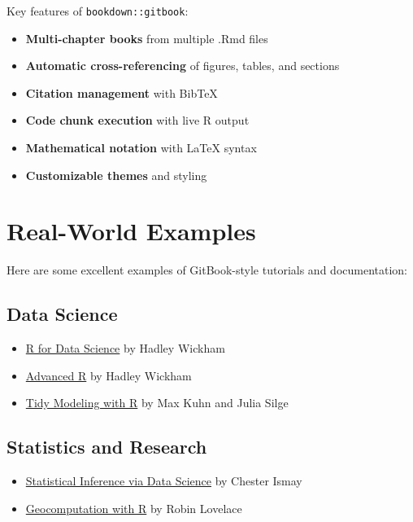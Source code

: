 \documentclass[
]{book}
\providecommand{\tightlist}{%
  \setlength{\itemsep}{0pt}\setlength{\parskip}{0pt}}
\begin{document}
Key features of \texttt{bookdown::gitbook}:

\begin{itemize}
\tightlist
\item
  \textbf{Multi-chapter books} from multiple .Rmd files
\item
  \textbf{Automatic cross-referencing} of figures, tables, and sections
\item
  \textbf{Citation management} with BibTeX
\item
  \textbf{Code chunk execution} with live R output
\item
  \textbf{Mathematical notation} with LaTeX syntax
\item
  \textbf{Customizable themes} and styling
\end{itemize}

\section{Real-World Examples}\label{real-world-examples}

Here are some excellent examples of GitBook-style tutorials and documentation:

\subsection{Data Science}\label{data-science}

\begin{itemize}
\tightlist
\item
  \href{https://r4ds.had.co.nz/}{R for Data Science} by Hadley Wickham
\item
  \href{https://adv-r.hadley.nz/}{Advanced R} by Hadley Wickham
\item
  \href{https://www.tmwr.org/}{Tidy Modeling with R} by Max Kuhn and Julia Silge
\end{itemize}

\subsection{Statistics and Research}\label{statistics-and-research}

\begin{itemize}
\tightlist
\item
  \href{https://moderndive.com/}{Statistical Inference via Data Science} by Chester Ismay
\item
  \href{https://geocompr.robinlovelace.net/}{Geocomputation with R} by Robin Lovelace
\end{itemize}
\end{document}
